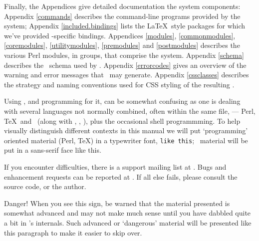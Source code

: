 \documentclass{book}
\begin{document}
Finally, the Appendices give detailed documentation the system components:
Appendix \ref{commands} describes the command-line programs provided by the system;
Appendix \ref{included.bindings} lists the \LaTeX\ style packages for which
we've provided \LaTeXML-specific bindings.
Appendices \ref{modules},  \ref{commonmodules}, \ref{coremodules}, \ref{utilitymodules},
\ref{premodules} and \ref{postmodules}
describes the various Perl modules, in groups, that comprise the system.
Appendix \ref{schema} describes the \XML\ schema used by \LaTeXML.
Appendix \ref{errorcodes} gives an overview of the warning and
error messages that \LaTeXML\ may generate.
Appendix \ref{cssclasses} describes the strategy and naming conventions
used for CSS styling of the resulting \HTML.

Using \LaTeXML, and programming for it, can be somewhat confusing as one is dealing with several
languages not normally combined, often within the same file,
--- Perl, \TeX\ and \XML\ (along with \XSLT, \HTML, \CSS),
plus the occasional shell programmming.
To help visually distinguish different contexts in this manual
we will put `programming' oriented material (Perl, \TeX) in a typewriter font,
\texttt{like this}; \XML\ material will be put in a sans-serif face
\textsf{like this}.

\vskip 1cm\relax
If you encounter difficulties, there is a support mailing list at
.
Bugs and enhancement requests can be reported at
.
If all else fails, please consult the source code, or the author.

\begin{advanced}
Danger! When you see this sign, be warned that the material presented is
somewhat advanced and may not make much sense until you have dabbled quite
a bit in \LaTeXML's internals.
Such advanced or `dangerous' material will be presented like this paragraph
to make it easier to skip over.
\end{advanced}

\end{document}
